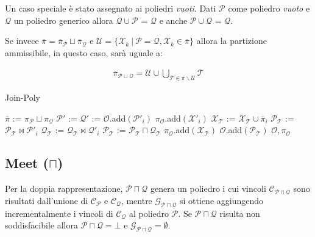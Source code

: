 \documentclass{mimosis}
\theoremstyle{definition}
\begin{document}
Un caso speciale è stato assegnato ai poliedri \emph{vuoti}. Dati \(\mathcal{P}\) come
poliedro \emph{vuoto} e \(\mathcal{Q}\) un poliedro generico allora \(\mathcal{Q} \cup
\mathcal{P}\) = \(\mathcal{Q}\) e anche \(\mathcal{P} \cup
\mathcal{Q}\) = \(\mathcal{Q}\).

Se invece \(\overline{\pi} = \overline{\pi}_{\mathcal{P}} \sqcup
\overline{\pi}_{\mathcal{Q}}\) e \(\mathcal{U} = \{\mathcal{X}_k \: | \: \mathcal{P}
= \mathcal{Q}, \mathcal{X}_k \in \overline{\pi} \}\) allora la partizione
ammissibile, in questo caso, sarà uguale a:

\begin{align*}
\overline{\pi}_{\mathcal{P} \sqcup \mathcal{Q}} = \mathcal{U} \cup \bigcup_{\mathcal{T} \in \overline{\pi} \backslash \mathcal{U}} \mathcal{T}
\end{align*}

\begin{algorithm}[H]
\caption{Join-Poly}\label{join-poly}
\begin{algorithmic}[1]
\State$\overline{\pi}$ := $\pi_{\mathcal{P}} \sqcup \pi_{\mathcal{Q}}$
\State$\mathcal{P}'$ := 
\State$\mathcal{Q}'$ := 
\State$\mathcal{O}$.add$(\mathcal{P}'_{i})$
\State$\pi_{\mathcal{O}}$.add$(\mathcal{X}'_{i})$
\Else
\State$\mathcal{X}_{\mathcal{T}}$ := $\mathcal{X}_{\mathcal{T}} \cup \overline{\pi}_{i}$
\State$\mathcal{P}_{\mathcal{T}}$ := $\mathcal{P}_{\mathcal{T}} \bowtie \mathcal{P}'_{i}$
\State$\mathcal{Q}_{\mathcal{T}}$ := $\mathcal{Q}_{\mathcal{T}} \bowtie \mathcal{Q}'_{i}$
\EndIf
\EndFor
\State$\mathcal{P}_{\mathcal{T}}$ := $\mathcal{P}_{\mathcal{T}} \sqcap \mathcal{Q}_{\mathcal{T}}$
\State$\pi_{\mathcal{O}}$.add$(\mathcal{X}_{\mathcal{T}})$
\State$\mathcal{O}$.add$(\mathcal{P}_{\mathcal{T}})$
\State\Return$\mathcal{O}, \pi_{\mathcal{O}}$
\EndFunction
\end{algorithmic}
\end{algorithm}

\subsection{Meet (\(\sqcap\))}
\label{sec:org54f280e}
Per la doppia rappresentazione, \(\mathcal{P} \sqcap \mathcal{Q}\) genera un
poliedro i cui vincoli \(\mathcal{C}_{\mathcal{P} \sqcap \mathcal{Q}}\) sono
risultati dall'unione di \(\mathcal{C}_{\mathcal{P}}\) e
\(\mathcal{C}_{\mathcal{Q}}\), mentre \(\mathcal{G}_{\mathcal{P} \sqcap
\mathcal{Q}}\) si ottiene aggiungendo incrementalmente i vincoli di
\(\mathcal{C}_{\mathcal{Q}}\) al poliedro \(\mathcal{P}\). Se \(\mathcal{P} \sqcap
\mathcal{Q}\) risulta non soddisfacibile allora \(\mathcal{P} \sqcap \mathcal{Q} =
\bot\) e \(\mathcal{G}_{\mathcal{P} \sqcap \mathcal{Q}} = \emptyset\).
\end{document}
